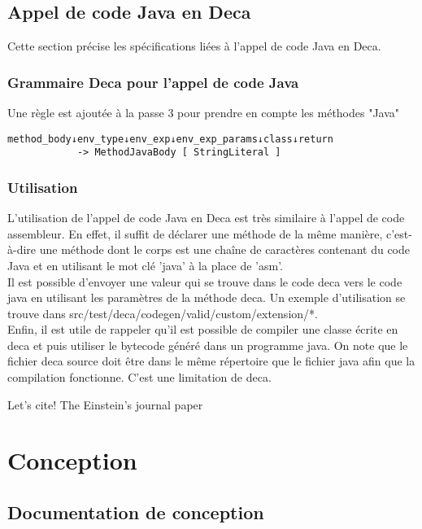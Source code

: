 \documentclass[12pt, a4paper, one side]{article}
\begin{document}
    \subsection{Appel de code Java en Deca}
    Cette section précise les spécifications liées à l'appel de code Java en Deca.
    \subsubsection{Grammaire Deca pour l'appel de code Java}
    Une règle est ajoutée à la passe 3 pour prendre en compte les méthodes "Java"
    \begin{lstlisting}
method_body↓env_type↓env_exp↓env_exp_params↓class↓return
            -> MethodJavaBody [ StringLiteral ]
    \end{lstlisting}

    \subsubsection{Utilisation}
    L'utilisation de l'appel de code Java en Deca est très similaire à l'appel de code assembleur. En effet, il suffit de déclarer une méthode de la même manière, c'est-à-dire une méthode dont le corps est une chaîne de caractères contenant du code Java et en utilisant le mot clé 'java' à la place de 'asm'.
    \\

    Il est possible d'envoyer une valeur qui se trouve dans le code deca vers le code java en utilisant les paramètres de la méthode deca. Un exemple d'utilisation se trouve dans src/test/deca/codegen/valid/custom/extension/*.
    \\

    Enfin, il est utile de rappeler qu'il est possible de compiler une classe écrite en deca et puis utiliser le bytecode généré dans un programme java. On note que le fichier deca source doit être dans le même répertoire que le fichier java afin que la compilation fonctionne. C'est une limitation de deca.

    Let's cite! The Einstein's journal paper \parencite[see]{knuthwebsite}


    \section{Conception}
    \subsection{Documentation de conception}
\end{document}
